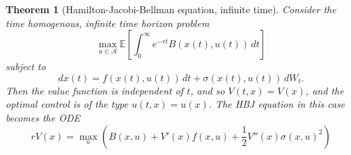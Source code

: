 \documentclass[10pt, oneside, reqno]{amsart}
\theoremstyle{plain}%
\newtheorem{thm}{Theorem}[section]
\numberwithin{equation}{section}
\theoremstyle{definition}
\theoremstyle{remark}
\newcommand{\E}{\mathbb{E}}
\begin{document}
\begin{thm}[Hamilton-Jacobi-Bellman equation, infinite time]
	Consider the time homogenous, infinite time horizon problem \[
		\max_{u \in \mathcal A} \E \left[ \int_0^\infty e^{-rt} B(x(t), u(t)) \, dt \right] 
	\] subject to \[
		dx(t) = f(x(t), u(t)) \, dt + \sigma(x(t), u(t)) \, dW_t.
	\] Then the value function is independent of $t$, and so $V(t,x) = V(x)$, and the optimal control is of the type $u(t, x) = u(x)$.  The HBJ equation in this case becomes the ODE \[
		rV(x) = \max_u \left( B(x, u) + V'(x) f(x, u) + \frac{1}{2} V''(x) \sigma(x, u)^2 \right)
	\] 
\end{thm}
\end{document}
